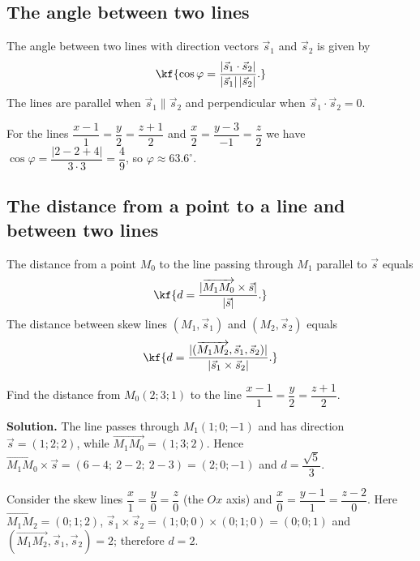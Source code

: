 \subsection{The angle between two lines}

The angle between two lines with direction vectors $\vec s_1$ and $\vec s_2$
is given by
\[\kf{\cos\varphi=\frac{|\vec s_1\cdot\vec s_2|}{|\vec s_1|\,|\vec s_2|}.}\]
The lines are parallel when $\vec s_1\parallel\vec s_2$ and perpendicular when
$\vec s_1\cdot\vec s_2=0$.

\begin{misol}
For the lines $\dfrac{x-1}{1}=\dfrac{y}{2}=\dfrac{z+1}{2}$ and
$\dfrac{x}{2}=\dfrac{y-3}{-1}=\dfrac{z}{2}$ we have
$\cos\varphi=\dfrac{|2-2+4|}{3\cdot3}=\dfrac49$, so $\varphi\approx63.6^\circ$.
\end{misol}

\subsection{The distance from a point to a line and between two lines}

\begin{teorema}
The distance from a point $M_0$ to the line passing through $M_1$ parallel
to $\vec s$ equals
\[\kf{d=\frac{|\overrightarrow{M_1M_0}\times\vec s|}{|\vec s|}.}\]
The distance between skew lines $(M_1,\vec s_1)$ and $(M_2,\vec s_2)$ equals
\[\kf{d=\frac{|(\overrightarrow{M_1M_2},\vec s_1,\vec s_2)|}{|\vec s_1\times\vec s_2|}.}\]
\end{teorema}

\begin{misol}
Find the distance from $M_0(2;3;1)$ to the line
$\dfrac{x-1}{1}=\dfrac{y}{2}=\dfrac{z+1}{2}$.

\textbf{Solution.} The line passes through $M_1(1;0;-1)$ and has direction
$\vec s=(1;2;2)$, while $\overrightarrow{M_1M_0}=(1;3;2)$. Hence
$\overrightarrow{M_1M_0}\times\vec s=(6-4;\ 2-2;\ 2-3)=(2;0;-1)$ and
$d=\dfrac{\sqrt5}{3}$.
\end{misol}

\begin{misol}
Consider the skew lines $\dfrac{x}{1}=\dfrac{y}{0}=\dfrac{z}{0}$ (the $Ox$ axis)
and $\dfrac{x}{0}=\dfrac{y-1}{1}=\dfrac{z-2}{0}$. Here
$\overrightarrow{M_1M_2}=(0;1;2)$, $\vec s_1\times\vec s_2=(1;0;0)\times(0;1;0)=(0;0;1)$
and $(\overrightarrow{M_1M_2},\vec s_1,\vec s_2)=2$; therefore $d=2$.
\end{misol}

